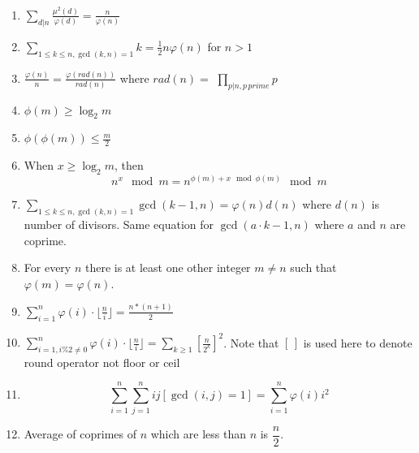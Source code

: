 \begin{enumerate}[resume]
    \item $\displaystyle \sum\limits_{d\vert{n}}^{} \frac{\mu^2(d)}{\varphi(d)}=\frac{n}{\varphi(n)}$
    \item $\displaystyle \sum\limits_{1\leq k \leq n, \gcd(k, n)=1}k=\frac{1}{2}n\varphi(n)$ for $n > 1$
    \item $\displaystyle \frac{\varphi(n)}{n}=\frac{\varphi(rad(n))}{rad(n)}$ where $rad(n)=$
    $\displaystyle \prod\limits_{p\vert n, p \, prime} p$
    \item $\displaystyle \phi(m) \geq \log_2{m}$
    \item $\displaystyle \phi(\phi(m))\leq\frac{m}{2}$
    \item When $\displaystyle x \geq \log_2m$, then
    \[n^x\mod m=n^{\phi(m) + x\mod \phi(m)}\mod m\]
    \item $\displaystyle \sum\limits_{1\leq k\leq n, \gcd(k, n)=1}\gcd(k-1, n)=\varphi(n)d(n)$ where $d(n)$ is number of divisors. Same equation for $\displaystyle \gcd(a \cdot k-1, n)$ where $\displaystyle a$ and $n$ are coprime.
    \item For every $n$ there is at least one other integer $m\ne n$ such that $\displaystyle \varphi(m)=\varphi(n).$
    \item $\displaystyle \sum\limits_{i=1}^{n} {\varphi(i) \cdot \lfloor\frac{n}{i}\rfloor=\frac{n*(n+1)}{2}}$
    \item $\displaystyle \sum\limits_{i=1, i \% 2 \ne 0 }^{n} \varphi(i) \cdot \lfloor\frac{n}{i}\rfloor=\sum\limits_{k\geq 1}[\frac{n}{2^k}]^2$.
    Note that $[\, ]$ is used here to denote round operator not floor or ceil
    \item \[\displaystyle \sum\limits_{i=1}^{n}\sum\limits_{j=1}^{n}ij[\gcd(i, j)=1]=\sum\limits_{i=1}^{n}\varphi(i)i^2\]
    \item Average of coprimes of $n$ which are less than $n$ is $\displaystyle \dfrac{n}{2}$.
\end{enumerate}
